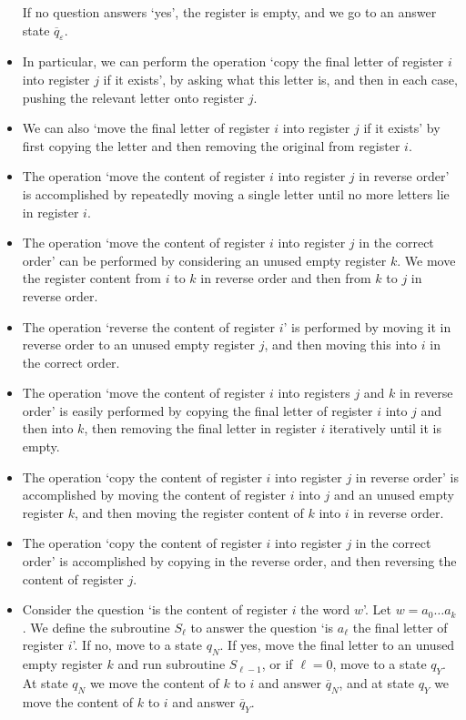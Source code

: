 \begin{itemize}
	If no question answers `yes', the register is empty, and we go to an answer state \( \overline q_\varepsilon \).
	\item In particular, we can perform the operation `copy the final letter of register \( i \) into register \( j \) if it exists', by asking what this letter is, and then in each case, pushing the relevant letter onto register \( j \).
	\item We can also `move the final letter of register \( i \) into register \( j \) if it exists' by first copying the letter and then removing the original from register \( i \).
	\item The operation `move the content of register \( i \) into register \( j \) in reverse order' is accomplished by repeatedly moving a single letter until no more letters lie in register \( i \).
	\item The operation `move the content of register \( i \) into register \( j \) in the correct order' can be performed by considering an unused empty register \( k \).
	We move the register content from \( i \) to \( k \) in reverse order and then from \( k \) to \( j \) in reverse order.
	\item The operation `reverse the content of register \( i \)' is performed by moving it in reverse order to an unused empty register \( j \), and then moving this into \( i \) in the correct order.
	\item The operation `move the content of register \( i \) into registers \( j \) and \( k \) in reverse order' is easily performed by copying the final letter of register \( i \) into \( j \) and then into \( k \), then removing the final letter in register \( i \) iteratively until it is empty.
	\item The operation `copy the content of register \( i \) into register \( j \) in reverse order' is accomplished by moving the content of register \( i \) into \( j \) and an unused empty register \( k \), and then moving the register content of \( k \) into \( i \) in reverse order.
	\item The operation `copy the content of register \( i \) into register \( j \) in the correct order' is accomplished by copying in the reverse order, and then reversing the content of register \( j \).
	\item Consider the question `is the content of register \( i \) the word \( w \)'.
	Let \( w = a_0 \dots a_k \).
	We define the subroutine \( S_\ell \) to answer the question `is \( a_\ell \) the final letter of register \( i \)'.
	If no, move to a state \( q_N \).
	If yes, move the final letter to an unused empty register \( k \) and run subroutine \( S_{\ell-1} \), or if \( \ell = 0 \), move to a state \( q_Y \).
	At state \( q_N \) we move the content of \( k \) to \( i \) and answer \( \overline q_N \), and at state \( q_Y \) we move the content of \( k \) to \( i \) and answer \( \overline q_Y \).
\end{itemize}

